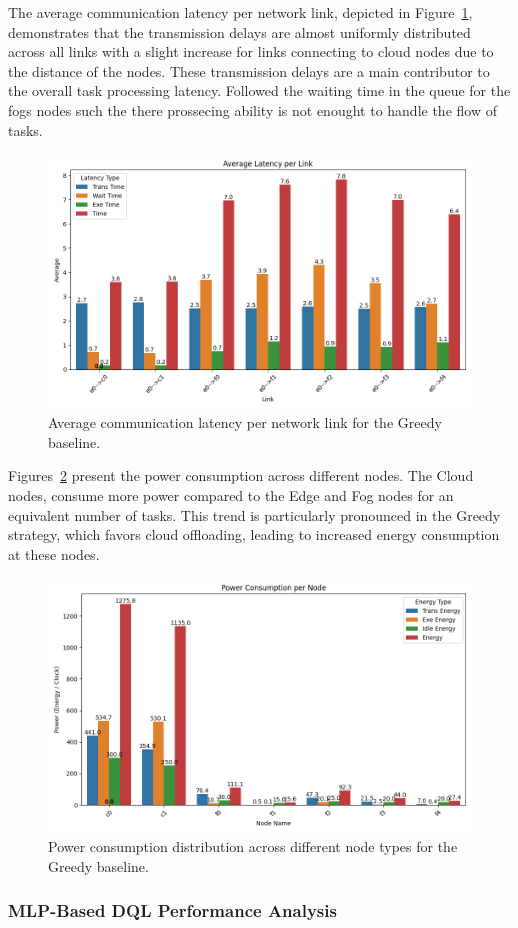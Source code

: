 \documentclass[preprint,3p,authoryear]{elsarticle}
\begin{document}
The average communication latency per network link, depicted in Figure~\ref{fig:greedy-avg-latency}, demonstrates that the transmission delays are almost uniformly distributed across all links with a slight increase for links connecting to cloud nodes due to the distance of the nodes. These transmission delays are a main contributor to the overall task processing latency. Followed the waiting time in the queue for the fogs nodes such the there prossecing ability is not enought to handle the flow of tasks.

\begin{figure}[H]
    \centering
    \includegraphics[width=0.5\linewidth]{figs/Greedy/avg_latency_per_link.png}
    \caption{Average communication latency per network link for the Greedy baseline.}
    \label{fig:greedy-avg-latency}
\end{figure}


Figures~\ref{fig:greedy-power-consumption} present the power consumption across different nodes. The Cloud nodes, consume more power compared to the Edge and Fog nodes for an equivalent number of tasks. This trend is particularly pronounced in the Greedy strategy, which favors cloud offloading, leading to increased energy consumption at these nodes.

\begin{figure}[H]
    \centering
    \includegraphics[width=0.5\linewidth]{figs/Greedy/power_consumption_per_node.png}
    \caption{Power consumption distribution across different node types for the Greedy baseline.}
    \label{fig:greedy-power-consumption}
\end{figure}


\subsubsection{MLP-Based DQL Performance Analysis}\label{subsubsec:mlp-DQL-analysis}
\end{document}
